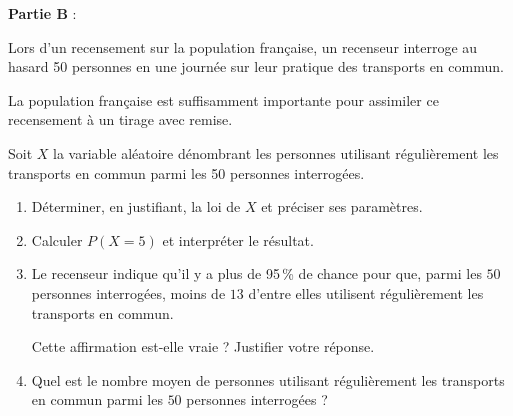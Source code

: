 \documentclass[10pt]{article}
\begin{document}
\bigskip

\textbf{Partie B} :

\medskip

Lors d'un recensement sur la population française, un recenseur interroge au hasard 50 personnes en une journée sur leur pratique des transports en commun. 

La population française est suffisamment importante pour assimiler ce recensement à un tirage avec remise.

Soit $X$ la variable aléatoire dénombrant les personnes utilisant régulièrement les transports en commun parmi les 50 personnes interrogées.

\medskip

\begin{enumerate}
\item Déterminer, en justifiant, la loi de $X$ et préciser ses paramètres.
\item Calculer $P(X = 5)$ et interpréter le résultat.
\item Le recenseur indique qu'il y a plus de 95\,\% de chance pour que, parmi les $50$ personnes interrogées, moins de $13$ d'entre elles utilisent régulièrement les transports en commun.

Cette affirmation est-elle vraie ? Justifier votre réponse.
\item Quel est le nombre moyen de personnes utilisant régulièrement les transports en commun parmi les $50$ personnes interrogées ?
\end{enumerate}

\bigskip
\end{document}
